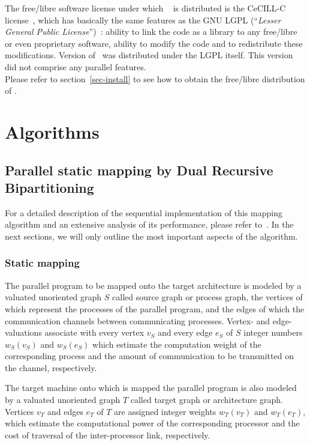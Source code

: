 The free/libre software license under which \scotch\ {\sc\scotchver} is
distributed is the CeCILL-C license~\cite{cecill}, which has basically
the same features as the GNU LGPL (``{\it Lesser General Public
License}'')~\cite{lgpl}: ability to link the code as a library to any
free/libre or even proprietary software, ability to modify the code
and to redistribute these modifications. Version {} of
\scotch\ was distributed under the LGPL itself. This version did not
comprise any parallel features.
\\

Please refer to section~\ref{sec-install} to see how to obtain the
free/libre distribution of \scotch.

\section{Algorithms}
\label{sec-algo}

\subsection{Parallel static mapping by Dual Recursive Bipartitioning}
\label{sec-drb}

For a detailed description of the sequential implementation of this
mapping algorithm and an extensive analysis of its performance, please
refer to~\cite{pell94a,pero96b}.
In the next sections, we will only outline the most important aspects
of the algorithm.

\subsubsection{Static mapping}

The parallel program to be mapped onto the target architecture is modeled
by a valuated unoriented graph $S$ called source graph or
process graph, the vertices of which represent the processes of the
parallel program, and the edges of which the communication channels between
communicating processes.
Vertex- and edge- valuations associate with every vertex $v_S$ and every
edge $e_S$ of $S$ integer numbers $w_S(v_S)$ and $w_S(e_S)$ which
estimate the computation weight of the corresponding process
and the amount of communication to be transmitted on the channel,
respectively.

The target machine onto which is mapped the parallel program is also
modeled by a valuated unoriented graph $T$ called target graph
or architecture graph.
Vertices $v_T$ and edges $e_T$ of $T$ are assigned integer weights
$w_T(v_T)$ and $w_T(e_T)$, which estimate the computational power of the
corresponding processor and the cost of traversal of the inter-processor
link, respectively.

